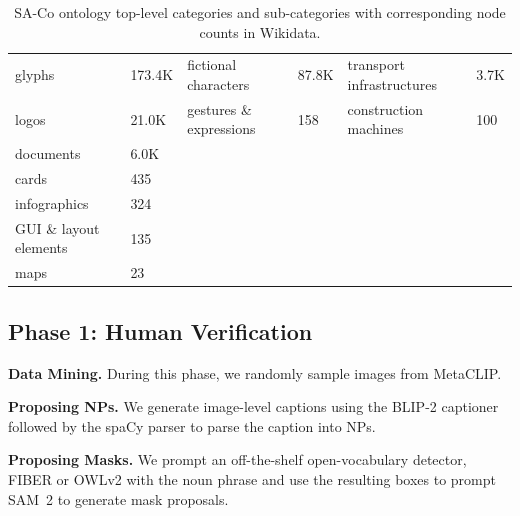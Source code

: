 \documentclass[]{fairmeta}
\newcommand{\samtwo}{SAM~2\xspace}
\newcommand{\dsname}{{SA-Co}\xspace}
\renewcommand{\paragraph}[1]{%
	\noindent\textbf{#1.}\noindent\xspace%
}
\begin{document}
\begin{table}[h]
{{{\begin{NiceTabular}{R{0.23\textwidth}R{0.1\textwidth}R{0.23\textwidth}R{0.1\textwidth}R{0.23\textwidth}R{0.1\textwidth}}
					\cmidrule(l){1-2}
					glyphs & 173.4K & fictional characters & 87.8K & transport infrastructures & 3.7K \\
					logos & 21.0K & gestures \& expressions & 158 & construction machines & 100 \\
					documents & 6.0K &  &  &  &  \\
					cards & 435 &  &  &  &  \\
					infographics & 324 &  &  &  &  \\
					GUI \& layout elements & 135 &  &  &  &  \\
					maps & 23 &  &  &  &  \\
				\end{NiceTabular}
			}
	}}
	\caption{\dsname ontology top-level categories and sub-categories with corresponding node counts in Wikidata.}
	\label{table:wiki_ontology_categories}
\end{table}

\subsection{Phase 1: Human Verification}
\paragraph{Data Mining} During this phase, we randomly sample images from MetaCLIP.

\paragraph{Proposing NPs} We generate image-level captions using the BLIP-2 captioner \citep{li2023blip2bootstrappinglanguageimagepretraining} followed by the spaCy parser \citep{Honnibal_spaCy_Industrial-strength_Natural_2020} to parse the caption into NPs.

\paragraph{Proposing Masks} We prompt an off-the-shelf open-vocabulary detector, FIBER \citep{dou2022coarsetofinevisionlanguagepretrainingfusion} or OWLv2 \citep{minderer2024scalingopenvocabularyobjectdetection} with the noun phrase and use the resulting boxes to prompt \samtwo to generate mask proposals.
\end{document}
